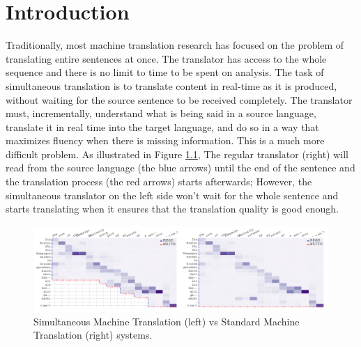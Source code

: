 \documentclass{sfuthesis}
\begin{document}
%
\tableofcontents%
\clearpage

%
\listoftables%
\clearpage

%
\listoffigures%
\clearpage





%
%

\mainmatter%

\chapter{Introduction}
Traditionally, most machine translation research has focused on the problem of translating entire sentences at once. The translator has access to the whole sequence and there is no limit to time to be spent on analysis. The task of simultaneous translation is to translate content in real-time as it is produced, without waiting for the source sentence to be received completely. The translator must, incrementally, understand what is being said in a source language, translate it in real time into the target language, and do so in a way that maximizes fluency when there is missing information. This is a much more difficult problem. As illustrated in Figure \ref{fig:SMTVSMT}, The regular translator (right) will read from the source language (the blue arrows) until the end of the sentence and the translation process (the red arrows) starts afterwards; However, the simultaneous translator on the left side won't wait for the whole sentence and starts translating when it ensures that the translation quality is good enough.


\begin{figure}[b]
\centering
\includegraphics[scale=0.35]{./images/SMTVSMT}
\vspace{5mm}
\caption[Simultaneous MT vs Standard MT]{Simultaneous Machine Translation (left) vs Standard Machine Translation (right) systems.}
\label{fig:SMTVSMT}
\end{figure}
\end{document}
